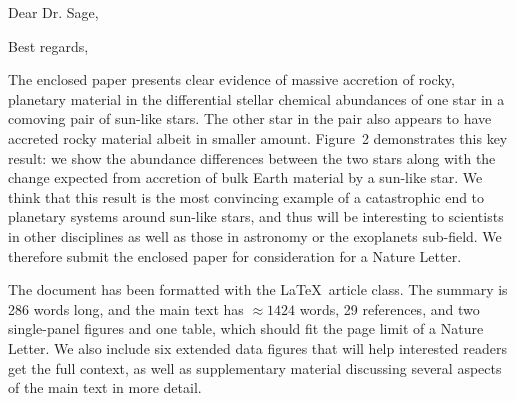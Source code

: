 \documentclass[12pt,letter,roman]{moderncv}
\begin{document}
\date{\today}
\opening{Dear Dr. Sage,}
\closing{Best regards,}
\makelettertitle

The enclosed paper presents clear evidence of massive accretion of rocky,
planetary material in the differential stellar chemical abundances of one star
in a comoving pair of sun-like stars. The other star in the pair also appears
to have accreted rocky material albeit in smaller amount. Figure~2 demonstrates
this key result: we show the abundance differences between the two stars
along with the change expected from accretion of bulk Earth material by a
sun-like star. We think that this result is the most convincing example of a
catastrophic end to planetary systems around sun-like stars, and thus will be
interesting to scientists in other disciplines as well as those in astronomy or
the exoplanets sub-field. We therefore submit the enclosed paper for
consideration for a Nature Letter.

The document has been formatted with the \LaTeX\ article class.
The summary is 286 words long, and the main text has $\approx 1424$ words,
29 references,
and two single-panel figures and one table, which should fit the page limit
of a Nature Letter.
We also include six extended data figures that will help interested readers
get the full context, as well as supplementary material discussing several
aspects of the main text in more detail.

\vspace{0.5cm}


\makeletterclosing
\end{document}
